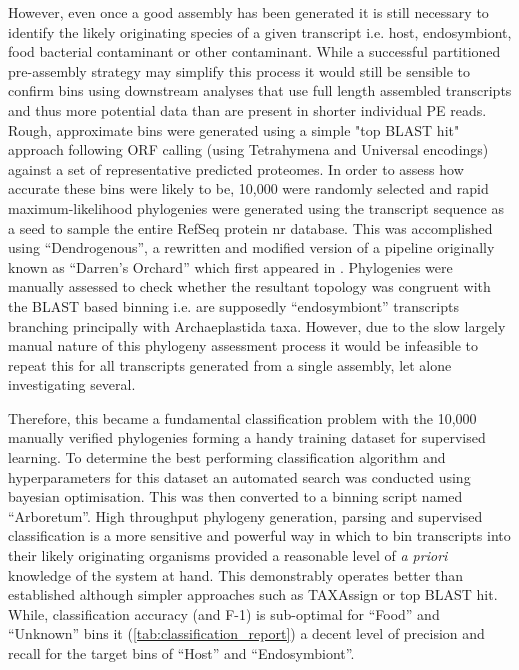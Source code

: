 However, even once a good assembly has been generated it is still necessary to identify the likely
originating species of a given transcript i.e. host, endosymbiont, food bacterial contaminant or other
contaminant.  While a successful partitioned pre-assembly strategy may simplify this process it would still
be sensible to confirm bins using downstream analyses that use full length assembled transcripts and thus
more potential data than are present in shorter individual PE reads.  Rough, approximate bins were
generated using a simple "top BLAST hit" approach following ORF calling (using Tetrahymena and Universal
encodings) against a set of representative predicted proteomes.  In order to assess how accurate these
bins were likely to be, 10,000 were randomly selected and rapid maximum-likelihood phylogenies were
generated using the transcript sequence as a seed to sample the entire RefSeq protein nr database.
This was accomplished using ``Dendrogenous'', a rewritten and modified version of a pipeline originally known 
as ``Darren's Orchard'' which first appeared in \citep{Richards2009g}.  Phylogenies were manually assessed to check
whether the resultant topology was congruent with the BLAST based binning i.e. are supposedly ``endosymbiont''
transcripts branching principally with Archaeplastida taxa.  
However, due to the slow largely manual nature of this phylogeny assessment process it would be infeasible
to repeat this for all transcripts generated from a single assembly, let alone investigating several. 

Therefore, this became a fundamental classification problem with the 10,000 manually verified phylogenies
forming a handy training dataset for supervised learning.   To determine the best performing
classification algorithm and hyperparameters for this dataset an automated search was conducted 
using bayesian optimisation.  This was then converted to a binning script named ``Arboretum''.
High throughput phylogeny generation, parsing and supervised classification is 
a more sensitive and powerful way in which to bin transcripts into their likely originating
organisms provided a reasonable level of \textit{a priori} knowledge of the system at hand.
This demonstrably operates better than established although simpler approaches such as
TAXAssign or top BLAST hit.  While, classification accuracy (and F-1) is sub-optimal 
for ``Food'' and ``Unknown'' bins it (\cref{tab:classification_report}) a decent level of 
precision and recall for the target bins of ``Host'' and ``Endosymbiont''.

